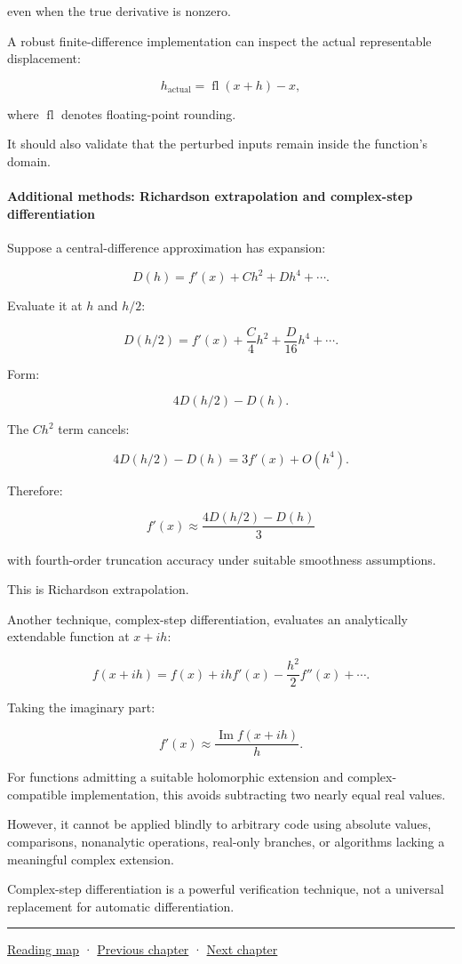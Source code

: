 even when the true derivative is nonzero.

A robust finite-difference implementation can inspect the actual representable displacement:

\[
h_{\mathrm{actual}}=\operatorname{fl}(x+h)-x,
\]

where \(\operatorname{fl}\) denotes floating-point rounding.

It should also validate that the perturbed inputs remain inside the function's domain.

\paragraph{Additional methods: Richardson extrapolation and complex-step differentiation}\label{02-foundations-ii-ch025-additional-methods-richardson-extrapolation-and-complex-step-differentiation}

Suppose a central-difference approximation has expansion:

\[
D(h)=f'(x)+Ch^2+Dh^4+\cdots.
\]

Evaluate it at \(h\) and \(h/2\):

\[
D(h/2)=f'(x)+\frac C4h^2+\frac D{16}h^4+\cdots.
\]

Form:

\[
4D(h/2)-D(h).
\]

The \(Ch^2\) term cancels:

\[
4D(h/2)-D(h) = 3f'(x)+O(h^4).
\]

Therefore:

\[
\boxed{ f'(x)\approx \frac{4D(h/2)-D(h)}3 }
\]

with fourth-order truncation accuracy under suitable smoothness assumptions.

This is Richardson extrapolation.

Another technique, complex-step differentiation, evaluates an analytically extendable function at \(x+ih\):

\[
f(x+ih) = f(x)+ihf'(x) -\frac{h^2}{2}f''(x)+\cdots.
\]

Taking the imaginary part:

\[
\boxed{ f'(x)\approx \frac{\operatorname{Im}f(x+ih)}h }.
\]

For functions admitting a suitable holomorphic extension and complex-compatible implementation, this avoids subtracting two nearly equal real values.

However, it cannot be applied blindly to arbitrary code using absolute values, comparisons, nonanalytic operations, real-only branches, or algorithms lacking a meaningful complex extension.

Complex-step differentiation is a powerful verification technique, not a universal replacement for automatic differentiation.

\begin{center}\rule{0.5\linewidth}{0.5pt}\end{center}

\hyperref[volume-reading-map]{Reading map} · \hyperref[02-foundations-ii-ch024]{Previous chapter} · \hyperref[02-foundations-ii-ch026]{Next chapter}
